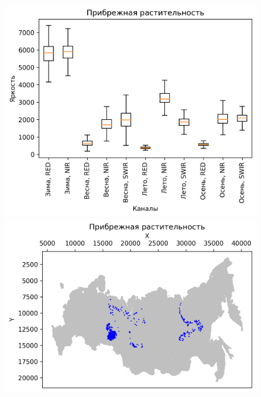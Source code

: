 \documentclass[14pt, a4paper, oneside]{extarticle}
\begin{document}
\begin{figure}[H]
    \centering
    \includegraphics[]{class-15-boxplot}
    \includegraphics[]{class-15-map}
\end{figure}
\end{document}
